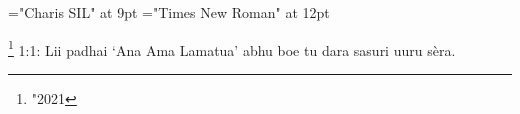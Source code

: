 \font\footnotescriptureText="Charis SIL" at 9pt
\font\scriptureText="Times New Roman" at 12pt

  \footnote {\char "2021} {1:1: Lii padhai ‘Ana Ama Lamatua’ abhu boe tu dara sasuri uuru
                  sèra.}

\bye
